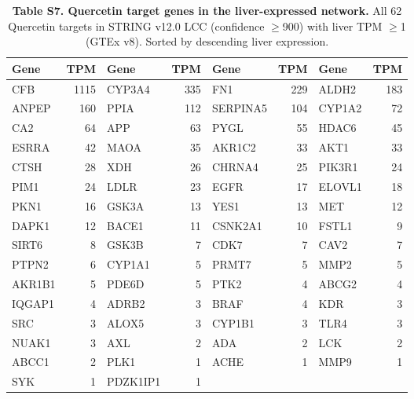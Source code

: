 \begin{table}[ht]
\centering
\caption{\textbf{Table S7. Quercetin target genes in the liver-expressed network.}
All 62 Quercetin targets in STRING v12.0 LCC (confidence $\geq$900) with liver TPM $\geq$1 (GTEx v8).
Sorted by descending liver expression.}
\label{tab:S7}
\vspace{0.5em}
\scriptsize
\begin{tabular}{lrlr|lrlr}
\toprule
\textbf{Gene} & \textbf{TPM} & \textbf{Gene} & \textbf{TPM} & \textbf{Gene} & \textbf{TPM} & \textbf{Gene} & \textbf{TPM} \\
\midrule
CFB & 1115 & CYP3A4 & 335 & FN1 & 229 & ALDH2 & 183 \\
ANPEP & 160 & PPIA & 112 & SERPINA5 & 104 & CYP1A2 & 72 \\
CA2 & 64 & APP & 63 & PYGL & 55 & HDAC6 & 45 \\
ESRRA & 42 & MAOA & 35 & AKR1C2 & 33 & AKT1 & 33 \\
CTSH & 28 & XDH & 26 & CHRNA4 & 25 & PIK3R1 & 24 \\
PIM1 & 24 & LDLR & 23 & EGFR & 17 & ELOVL1 & 18 \\
PKN1 & 16 & GSK3A & 13 & YES1 & 13 & MET & 12 \\
DAPK1 & 12 & BACE1 & 11 & CSNK2A1 & 10 & FSTL1 & 9 \\
SIRT6 & 8 & GSK3B & 7 & CDK7 & 7 & CAV2 & 7 \\
PTPN2 & 6 & CYP1A1 & 5 & PRMT7 & 5 & MMP2 & 5 \\
AKR1B1 & 5 & PDE6D & 5 & PTK2 & 4 & ABCG2 & 4 \\
IQGAP1 & 4 & ADRB2 & 3 & BRAF & 4 & KDR & 3 \\
SRC & 3 & ALOX5 & 3 & CYP1B1 & 3 & TLR4 & 3 \\
NUAK1 & 3 & AXL & 2 & ADA & 2 & LCK & 2 \\
ABCC1 & 2 & PLK1 & 1 & ACHE & 1 & MMP9 & 1 \\
SYK & 1 & PDZK1IP1 & 1 & & & & \\
\bottomrule
\end{tabular}
\end{table}

